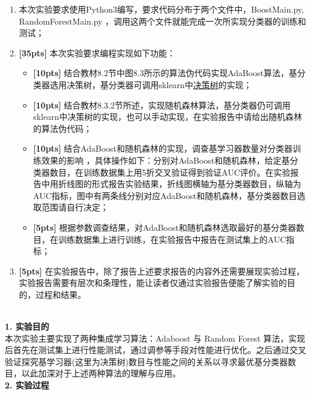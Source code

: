 \documentclass[a4paper,UTF8]{article}
\theoremstyle{definition}
\begin{document}
\begin{enumerate}[(1)]
	\item 本次实验要求使用Python3编写，要求代码分布于两个文件中，BoostMain.py, RandomForestMain.py ，调用这两个文件就能完成一次所实现分类器的训练和测试；
	
	\item \textbf{[35pts]} 本次实验要求编程实现如下功能：
	
	\begin{itemize}
		\item \textbf{[10pts]} 结合教材8.2节中图8.3所示的算法伪代码实现AdaBoost算法，基分类器选用决策树，基分类器可调用sklearn中\href{http://scikit-learn.org/stable/modules/generated/sklearn.tree.DecisionTreeClassifier.html}{决策树}的实现；
		\item \textbf{[10pts]} 结合教材8.3.2节所述，实现随机森林算法，基分类器仍可调用sklearn中决策树的实现，也可以手动实现，在实验报告中请给出随机森林的算法伪代码；
		\item \textbf{[10pts]} 结合AdaBoost和随机森林的实现，调查基学习器数量对分类器训练效果的影响 ，具体操作如下：分别对AdaBoost和随机森林，给定基分类器数目，在训练数据集上用5折交叉验证得到验证AUC评价。在实验报告中用折线图的形式报告实验结果，折线图横轴为基分类器数目，纵轴为AUC指标，图中有两条线分别对应AdaBoost和随机森林，基分类器数目选取范围请自行决定；
		\item \textbf{[5pts]} 根据参数调查结果，对AdaBoost和随机森林选取最好的基分类器数目，在训练数据集上进行训练，在实验报告中报告在测试集上的AUC指标；
	\end{itemize}
	
	\item \textbf{[5pts]} 在实验报告中，除了报告上述要求报告的内容外还需要展现实验过程，实验报告需要有层次和条理性，能让读者仅通过实验报告便能了解实验的目的，过程和结果。
	
\end{enumerate}
~\\[3pt]\textbf{1. 实验目的}
\\本次实验主要实现了两种集成学习算法：Adaboost 与 Random Forest 算法，实现后首先在测试集上进行性能测试，通过调参等手段对性能进行优化。之后通过交叉验证探究基学习器(这里为决策树)数目与性能之间的关系以寻求最优基分类器数目，以此加深对于上述两种算法的理解与应用。
\\[3pt]\textbf{2. 实验过程}
\end{document}
